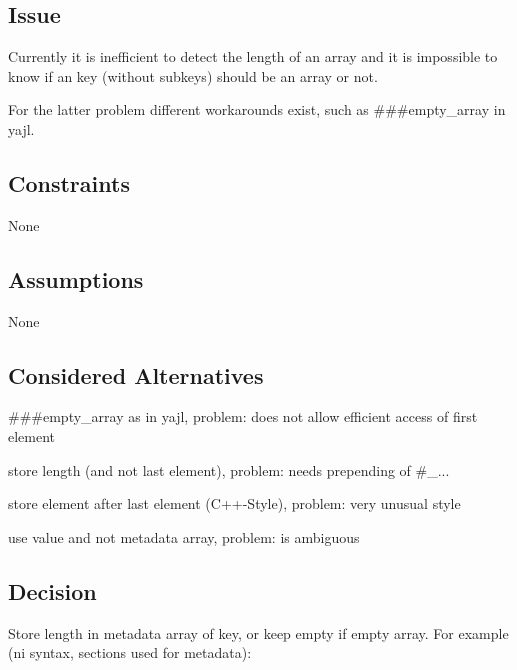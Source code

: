 \subsection*{Issue}

Currently it is inefficient to detect the length of an array and it is impossible to know if an key (without subkeys) should be an array or not.

For the latter problem different workarounds exist, such as {\ttfamily \#\#\#empty\+\_\+array} in {\ttfamily yajl}.

\subsection*{Constraints}


\begin{DoxyItemize}
\item None
\end{DoxyItemize}

\subsection*{Assumptions}


\begin{DoxyItemize}
\item None
\end{DoxyItemize}

\subsection*{Considered Alternatives}


\begin{DoxyItemize}
\item {\ttfamily \#\#\#empty\+\_\+array} as in {\ttfamily yajl}, problem\+: does not allow efficient access of first element
\item store length (and not last element), problem\+: needs prepending of {\ttfamily \#\+\_\+...}
\item store element after last element (C++-\/\+Style), problem\+: very unusual style
\item use value and not metadata array, problem\+: is ambiguous
\end{DoxyItemize}

\subsection*{Decision}

Store length in metadata {\ttfamily array} of key, or keep empty if empty array. For example ({\ttfamily ni syntax}, sections used for metadata)\+:

